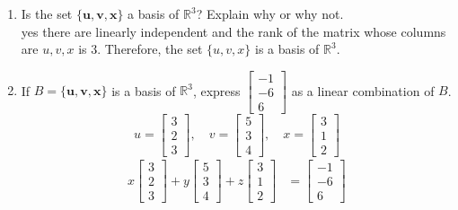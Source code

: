 \documentclass[11pt]{article}
\begin{document}
\begin{enumerate}
\begin{enumerate}
\item Is the set \(\{\mathbf{u}, \mathbf{v}, \mathbf{x}\}\) a basis of \(\mathbb{R}^3\)? Explain why or why not.\\
yes there are linearly independent and the rank of the matrix whose columns are \( u, v, x \) is 3. Therefore, the set \(\{u, v, x\}\) is a basis of \(\mathbb{R}^3\).

\item If \( B = \{\mathbf{u}, \mathbf{v}, \mathbf{x}\} \) is a basis of \(\mathbb{R}^3\), express \(\begin{bmatrix} -1 \\ -6 \\ 6 \end{bmatrix}\) as a linear combination of \( B \).\\
\[
u = \begin{bmatrix}
    3 \\
    2 \\
    3   
\end{bmatrix}, \quad
v = \begin{bmatrix}
    5 \\
    3 \\
    4
\end{bmatrix}, \quad
x = \begin{bmatrix}
    3 \\
    1 \\
    2
\end{bmatrix}
\]
\[
\begin{aligned}
    x\begin{bmatrix}
        3 \\
        2 \\
        3
    \end{bmatrix} +y\begin{bmatrix}
        5 \\
        3 \\
        4
    \end{bmatrix} + z\begin{bmatrix}
        3 \\
        1 \\
        2
    \end{bmatrix} &= \begin{bmatrix}
        -1 \\
        -6 \\
        6
    \end{bmatrix}
\end{aligned}
\]
\[
\begin{aligned}

\end{aligned}\]
\end{enumerate}
\end{enumerate}
\end{document}
